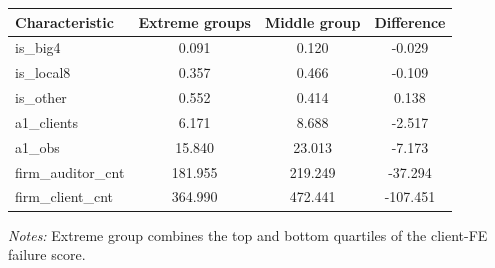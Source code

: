 \documentclass[10pt]{article}
\begin{document}
\begin{minipage}{19cm}\fontsize{10}{12}\selectfont\setlength{\tabcolsep}{4pt}\renewcommand{\arraystretch}{1.12}


\centering
{}
\begin{threeparttable}
\begin{tabular}{p{}ccc}
\toprule
Characteristic & Extreme groups & Middle group & Difference \\
\midrule
is\_big4 & 0.091 & 0.120 & -0.029 \\
is\_local8 & 0.357 & 0.466 & -0.109 \\
is\_other & 0.552 & 0.414 & 0.138 \\
a1\_clients & 6.171 & 8.688 & -2.517 \\
a1\_obs & 15.840 & 23.013 & -7.173 \\
firm\_auditor\_cnt & 181.955 & 219.249 & -37.294 \\
firm\_client\_cnt & 364.990 & 472.441 & -107.451 \\
\bottomrule
\end{tabular}
\begin{tablenotes}\fontsize{9}{11}\selectfont
\item \raggedright \fontsize{9}{11}\selectfont \textit{Notes:} Extreme group combines the top and bottom quartiles of the client-FE failure score.
\end{tablenotes}
\end{threeparttable}

\end{minipage}
\end{document}
